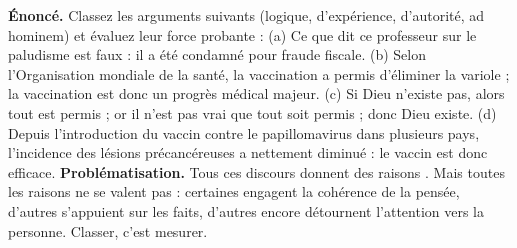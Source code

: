 \documentclass[11pt]{article}
\begin{document}
\begin{exoresolu}
\textbf{Énoncé.} Classez les arguments suivants (logique, d'expérience, d'autorité, ad hominem) et évaluez leur force probante : (a) \guillemotleft Ce que dit ce professeur sur le paludisme est faux : il a été condamné pour fraude fiscale. \guillemotright (b) \guillemotleft Selon l'Organisation mondiale de la santé, la vaccination a permis d'éliminer la variole ; la vaccination est donc un progrès médical majeur. \guillemotright (c) \guillemotleft Si Dieu n'existe pas, alors tout est permis ; or il n'est pas vrai que tout soit permis ; donc Dieu existe. \guillemotright (d) \guillemotleft Depuis l'introduction du vaccin contre le papillomavirus dans plusieurs pays, l'incidence des lésions précancéreuses a nettement diminué : le vaccin est donc efficace. \guillemotright
\tcblower
\textbf{Problématisation.} Tous ces discours \guillemotleft donnent des raisons \guillemotright. Mais toutes les raisons ne se valent pas : certaines engagent la cohérence de la pensée, d'autres s'appuient sur les faits, d'autres encore détournent l'attention vers la personne. Classer, c'est mesurer.


\end{exoresolu}
\end{document}
